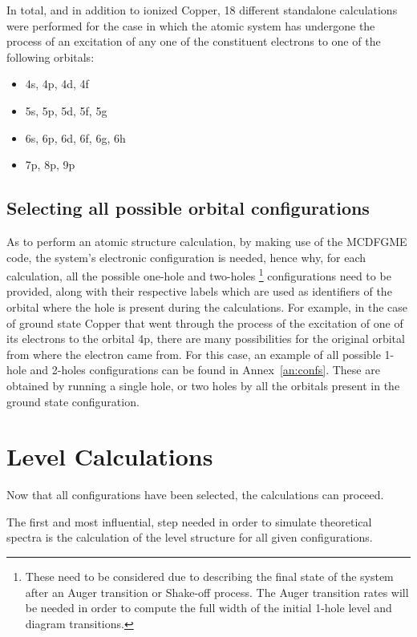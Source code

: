 In total, and in addition to ionized Copper, 18 different standalone calculations were performed for the case in which the atomic system has undergone the process of an excitation of any one of the constituent electrons to one of the following orbitals:

\begin{itemize}
    \item 4s, 4p, 4d, 4f
    \item 5s, 5p, 5d, 5f, 5g
    \item 6s, 6p, 6d, 6f, 6g, 6h
    \item 7p, 8p, 9p
\end{itemize}


\subsection{Selecting all possible orbital configurations}

As to perform an atomic structure calculation, by making use of the \gls{MCDFGME} code, the system's electronic configuration is needed, hence why, for each calculation, all the possible one-hole and two-holes \footnote{These need to be considered due to describing the final state of the system after an Auger transition or Shake-off process. The Auger transition rates will be needed in order to compute the full width of the initial 1-hole level and diagram transitions.} configurations need to be provided, along with their respective labels which are used as identifiers of the orbital where the hole is present during the calculations. For example, in the case of ground state Copper that went through the process of the excitation of one of its electrons to the orbital 4p, there are many possibilities for the original orbital from where the electron came from. For this case, an example of all possible 1-hole and 2-holes configurations can be found in Annex~\ref{an:confs}. These are obtained by running a single hole, or two holes by all the orbitals present in the ground state configuration.


\section{Level Calculations}
Now that all configurations have been selected, the calculations can proceed.

The first and most influential, step needed in order to simulate theoretical spectra is the calculation of the level structure for all given configurations.

